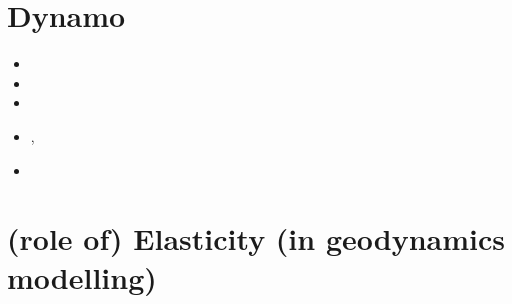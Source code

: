 \section{Dynamo}

\begin{scriptsize}
\begin{itemize}
\item[\twothousandfive] 
\item[\twothousandnine] 
\item[\twothousandeleven] 
\item[\twothousandthirteen] , 
\item[\twothousandsixteen] 
\end{itemize}
\end{scriptsize}

\section{(role of) Elasticity (in geodynamics modelling)}

